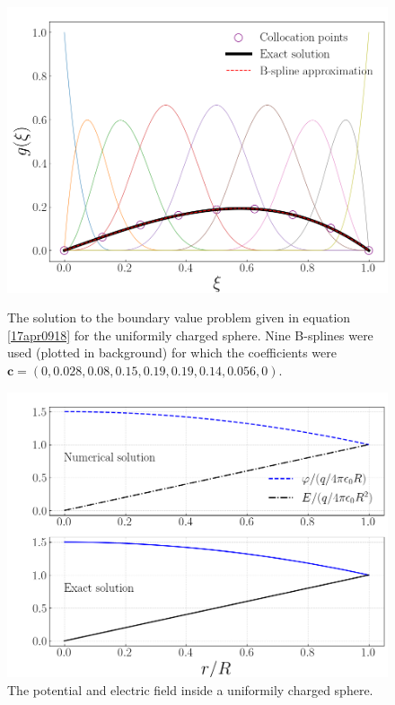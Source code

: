 \documentclass[twocolumn]{article}
\begin{document}
\begin{large}
\begin{figure}[b!]
    \includegraphics[scale=0.35]{Uniform_g.png}
    \caption{The solution to the boundary value problem given in equation \eqref{17apr0918} for the uniformily charged sphere. Nine B-splines were used (plotted in background) for which the coefficients were $\mathbf{c} = (0,0.028,0.08,0.15,0.19,0.19,0.14,0.056,0)$.}
    \label{17apr0917}
    \includegraphics[scale=0.35]{Uniform_EPhi.png}
    \caption{The potential and electric field inside a uniformily charged sphere.}
    \label{17apr0937}
\end{figure}


\end{large}
\end{document}
